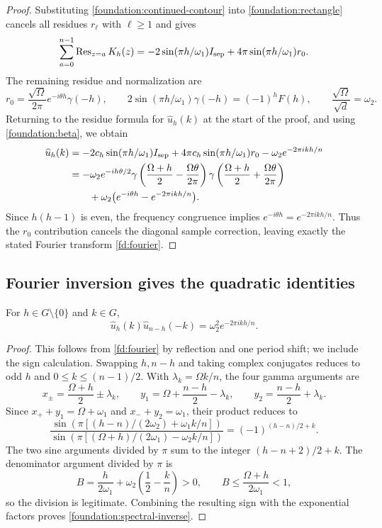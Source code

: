 \begin{proof}
Substituting \eqref{foundation:continued-contour} into
\eqref{foundation:rectangle} cancels all residues $r_\ell$ with
$\ell\geq1$ and gives
\[
 \sum_{a=0}^{n-1}\operatorname{Res}_{z=a}K_h(z)
 =-2\sin(\pi h/\omega_1)I_{\rm sep}
       +4\pi\sin(\pi h/\omega_1)r_0.
\]
The remaining residue and normalization are
\[
 r_0=\frac{\sqrt\Omega}{2\pi}e^{-i\theta h}\gamma(-h),\qquad
 2\sin(\pi h/\omega_1)\gamma(-h)=(-1)^hF(h),\qquad
 \frac{\sqrt\Omega}{\sqrt d}=\omega_2.
\]
Returning to the residue formula for $\widehat u_h(k)$ at the start
of the proof, and using \eqref{foundation:beta}, we obtain
\begin{align*}
 \widehat u_h(k)
 &=-2c_h\sin(\pi h/\omega_1)I_{\rm sep}
     +4\pi c_h\sin(\pi h/\omega_1)r_0-\omega_2e^{-2\pi ikh/n}\\
 &=-\omega_2e^{-ih\theta/2}
   \gamma\left(\frac{\Omega+h}{2}-\frac{\Omega\theta}{2\pi}\right)
   \gamma\left(\frac{\Omega+h}{2}+\frac{\Omega\theta}{2\pi}\right)\\
 &\qquad+\omega_2\bigl(e^{-i\theta h}-e^{-2\pi ikh/n}\bigr).
\end{align*}
Since $h(h-1)$ is even, the frequency congruence implies
$e^{-i\theta h}=e^{-2\pi ikh/n}$. Thus the $r_0$ contribution cancels
the diagonal sample correction, leaving exactly the stated Fourier
transform \eqref{fd:fourier}.
\end{proof}

\subsection{Fourier inversion gives the quadratic identities}

\begin{lemma}\label{foundation:fourier-products}
For $h\in G\setminus\{0\}$ and $k\in G$,
\begin{equation}\label{foundation:spectral-inverse}
 \widehat u_h(k)\widehat u_{n-h}(-k)
 =\omega_2^2e^{-2\pi ikh/n}.
\end{equation}
\end{lemma}

\begin{proof}
This follows from \eqref{fd:fourier} by reflection and one period
shift; we include the sign calculation. Swapping $h,n-h$ and taking
complex conjugates reduces to odd $h$ and
$0\leq k\leq(n-1)/2$. With $\lambda_k=\Omega k/n$, the four gamma
arguments are
\[
 x_\pm=\frac{\Omega+h}{2}\pm\lambda_k,\qquad
 y_1=\Omega+\frac{n-h}{2}-\lambda_k,\qquad
 y_2=\frac{n-h}{2}+\lambda_k.
\]
Since $x_++y_1=\Omega+\omega_1$ and $x_-+y_2=\omega_1$,
their product reduces to
\[
 \frac{\sin\!\left(\pi[(h-n)/(2\omega_2)+\omega_1k/n]\right)}
      {\sin\!\left(\pi[(\Omega+h)/(2\omega_1)-\omega_2k/n]\right)}
 =(-1)^{(h-n)/2+k}.
\]
The two sine arguments divided by $\pi$ sum to the integer
$(h-n+2)/2+k$. The denominator argument divided by $\pi$ is
\[
 B=\frac{h}{2\omega_1}+\omega_2\left(\frac12-\frac{k}{n}\right)>0,
 \qquad B\leq\frac{\Omega+h}{2\omega_1}<1,
\]
so the division is legitimate. Combining the resulting sign with the
exponential factors
proves \eqref{foundation:spectral-inverse}.
\end{proof}

